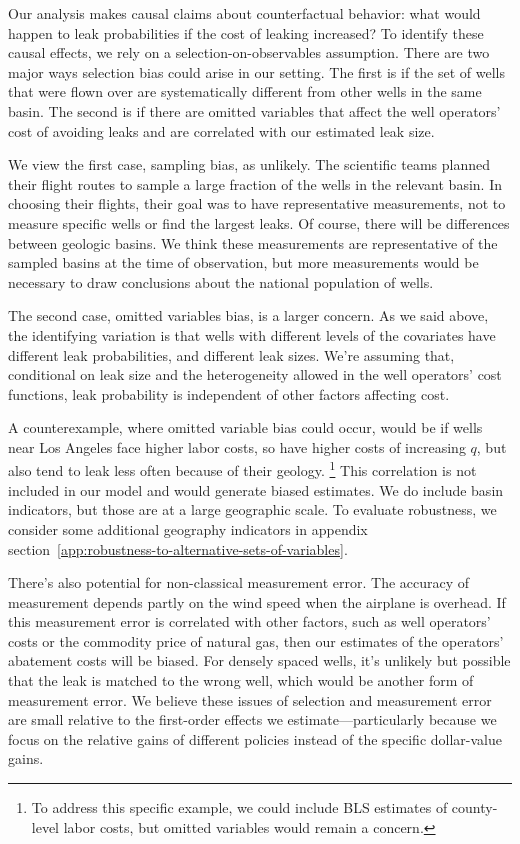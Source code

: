 \documentclass[12pt,oneside,letterpaper]{article}
\theoremstyle{definition}
\begin{document}
\begin{refsection}
Our analysis makes causal claims about counterfactual behavior: what would happen to leak probabilities if the cost of leaking increased?
To identify these causal effects, we rely on a selection-on-observables assumption.
There are two major ways selection bias could arise in our setting.
The first is if the set of wells that were flown over are systematically different from other wells in the same basin.
The second is if there are omitted variables that affect the well operators' cost of avoiding leaks and are correlated with our estimated leak size.


We view the first case, sampling bias, as unlikely.
The scientific teams planned their flight routes to sample a large fraction of the wells in the relevant basin.
In choosing their flights, their goal was to have representative measurements, not to measure specific wells or find the largest leaks.
Of course, there will be differences between geologic basins.
We think these measurements are representative of the sampled basins at the time of observation, but more measurements would be necessary to draw conclusions about the national population of wells.

The second case, omitted variables bias, is a larger concern.
As we said above, the identifying variation is that wells with different levels of the covariates have different leak probabilities, and different leak sizes.
We're assuming that, conditional on leak size and the heterogeneity allowed in the well operators' cost functions, leak probability is independent of other factors affecting cost.

A counterexample, where omitted variable bias could occur, would be if wells near Los Angeles face higher labor costs, so have higher costs of increasing \(q\), but also tend to leak less often because of their geology.%
\footnote{To address this specific example, we could include \gls{BLS} estimates of county-level labor costs, but omitted variables would remain a concern.}
This correlation is not included in our model and would generate biased estimates.
We do include basin indicators, but those are at a large geographic scale.
To evaluate robustness, we consider some additional geography indicators in appendix section~\ref{app:robustness-to-alternative-sets-of-variables}.

There's also potential for non-classical measurement error.
The accuracy of measurement depends partly on the wind speed when the airplane is overhead.
If this measurement error is correlated with other factors, such as well operators' costs or the commodity price of natural gas, then our estimates of the operators' abatement costs will be biased.
For densely spaced wells, it's unlikely but possible that the leak is matched to the wrong well, which would be another form of measurement error.
We believe these issues of selection and measurement error are small relative to the first-order effects we estimate---particularly because we focus on the relative gains of different policies instead of the specific dollar-value gains.



\end{refsection}
\end{document}
